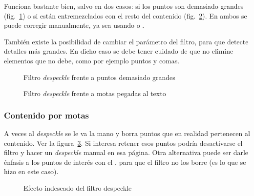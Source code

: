 \documentclass[%
	a5paper,
	10pt,
	twoside,
	openright,
	final,
]{memoir}
\begin{document}
	Funciona bastante bien, salvo en dos casos: si los puntos son demasiado grandes (fig.~\ref{fig:SToutputDespeckleSpot}) o si están entremezclados con el resto del contenido (fig.~\ref{fig:SToutputDespeckleSpeckle}). En ambos se puede corregir manualmente, ya sea usando \gimp o .

	También existe la posibilidad de cambiar el parámetro del filtro, para que detecte detalles más grandes. En dicho caso se debe tener cuidado de que no elimine elementos que no debe, como por ejemplo puntos y comas.

	\begin{figure}
		\hfill
		\caption{Filtro \emph{despeckle} frente a puntos demasiado grandes\label{fig:SToutputDespeckleSpot}}
	\end{figure}

	\begin{figure}
		\hfill
		\caption{Filtro \emph{despeckle} frente a motas pegadas al texto\label{fig:SToutputDespeckleSpeckle}}
	\end{figure}

	\subsubsection{Contenido por motas} A veces al \emph{despeckle} se le va la mano y borra puntos que en realidad pertenecen al contenido. Ver la figura~\ref{fig:SToutputDespeckle}. Si interesa retener esos puntos podría desactivarse el filtro y hacer un \emph{despeckle} manual en esa página. Otra alternativa puede ser darle énfasis a los puntos de interés con el \gimp, para que el filtro no los borre (es lo que se hizo en este caso).

	\begin{figure}
		\caption{Efecto indeseado del filtro despeckle\label{fig:SToutputDespeckle}}
	\end{figure}
\end{document}

